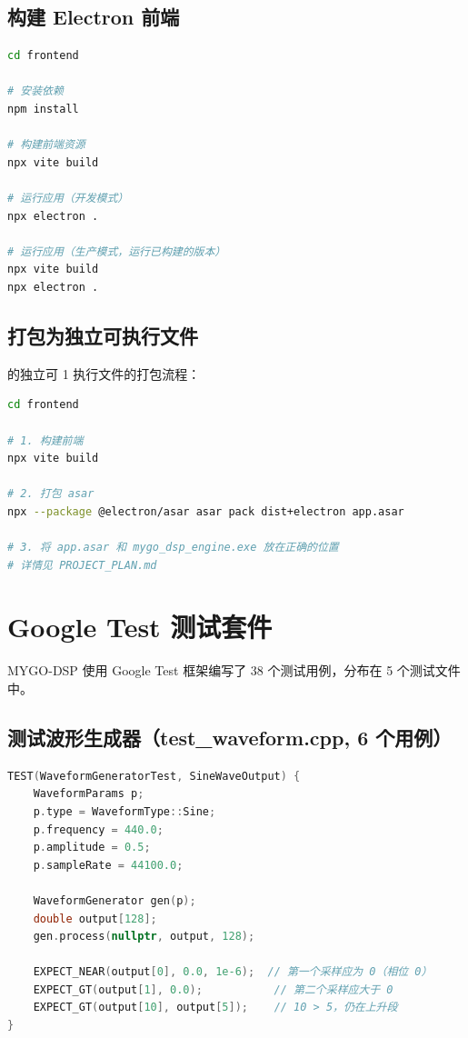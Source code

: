 ﻿\documentclass[12pt,a4paper,oneside]{ctexbook}
\begin{document}
\subsection{构建 Electron 前端}

\begin{lstlisting}[language=bash, caption={构建 Electron 前端}]
cd frontend

# 安装依赖
npm install

# 构建前端资源
npx vite build

# 运行应用（开发模式）
npx electron .

# 运行应用（生产模式，运行已构建的版本）
npx vite build
npx electron .
\end{lstlisting}

\subsection{打包为独立可执行文件}

的独立可 1 执行文件的打包流程：

\begin{lstlisting}[language=bash, caption={打包 Electron 应用}]
cd frontend

# 1. 构建前端
npx vite build

# 2. 打包 asar
npx --package @electron/asar asar pack dist+electron app.asar

# 3. 将 app.asar 和 mygo_dsp_engine.exe 放在正确的位置
# 详情见 PROJECT_PLAN.md
\end{lstlisting}

\section{Google Test 测试套件}

MYGO-DSP 使用 Google Test 框架编写了 38 个测试用例，分布在 5 个测试文件中。

\subsection{测试波形生成器（test\_waveform.cpp, 6 个用例）}

\begin{lstlisting}[language=C++, caption={正弦波输出测试}]
TEST(WaveformGeneratorTest, SineWaveOutput) {
    WaveformParams p;
    p.type = WaveformType::Sine;
    p.frequency = 440.0;
    p.amplitude = 0.5;
    p.sampleRate = 44100.0;

    WaveformGenerator gen(p);
    double output[128];
    gen.process(nullptr, output, 128);

    EXPECT_NEAR(output[0], 0.0, 1e-6);  // 第一个采样应为 0（相位 0）
    EXPECT_GT(output[1], 0.0);           // 第二个采样应大于 0
    EXPECT_GT(output[10], output[5]);    // 10 > 5，仍在上升段
}
\end{lstlisting}
\end{document}

